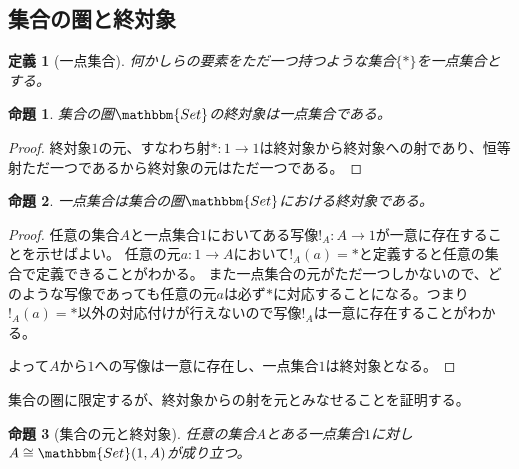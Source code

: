 \documentclass[dvipdfmx]{jsarticle}
\newcommand{\cat}[1]{\mathbbm{#1}}
\newcommand{\arrow}{\rightarrow}
\newcommand{\mor}[3]{#1:#2\arrow #3}
\newcommand{\arset}[3]{\cat{#1}(#2,#3)}
\newtheorem{proof}{証明}[section]
\newtheorem{prop}{命題}[section]
\newtheorem{define}{定義}[section]
\numberwithin{proof}{subsection}
\numberwithin{prop}{subsection}
\numberwithin{define}{subsection}
\begin{document}
	\subsection{集合の圏と終対象}
	\begin{define}[一点集合]
		何かしらの要素をただ一つ持つような集合$\{*\}$を一点集合とする。
	\end{define}
	\begin{prop}
		集合の圏$\cat{Set}$の終対象は一点集合である。
	\end{prop}
	\begin{proof}
		終対象$1$の元、すなわち射$\mor{*}{1}{1}$は終対象から終対象への射であり、恒等射ただ一つであるから終対象の元はただ一つである。
	\end{proof}
	\begin{prop}
		一点集合は集合の圏$\cat{Set}$における終対象である。
	\end{prop}
	\begin{proof}
		任意の集合$A$と一点集合$1$においてある写像$\mor{!_A}{A}{1}$が一意に存在することを示せばよい。
		任意の元$\mor{a}{1}{A}$において$!_A(a)=*$と定義すると任意の集合で定義できることがわかる。
		また一点集合の元がただ一つしかないので、どのような写像であっても任意の元$a$は必ず$*$に対応することになる。つまり$!_A(a)=*$以外の対応付けが行えないので写像$!_A$は一意に存在することがわかる。

		よって$A$から$1$への写像は一意に存在し、一点集合$1$は終対象となる。
	\end{proof}
	集合の圏に限定するが、終対象からの射を元とみなせることを証明する。
	\begin{prop}[集合の元と終対象]
		任意の集合$A$とある一点集合$1$に対し$A\cong\arset{Set}{1}{A}$が成り立つ。
	\end{prop}
\end{document}
